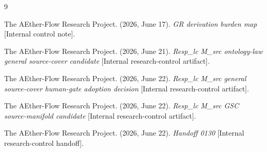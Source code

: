 \documentclass[11pt]{article}
\begin{document}
\begin{thebibliography}{9}

The AEther-Flow Research Project. (2026, June 17). \emph{GR derivation
burden map} [Internal control note].

The AEther-Flow Research Project. (2026, June 21). \emph{Resp\_lc M\_src
ontology-law general source-cover candidate}
[Internal research-control artifact].

The AEther-Flow Research Project. (2026, June 22). \emph{Resp\_lc M\_src
general source-cover human-gate adoption decision}
[Internal research-control artifact].

The AEther-Flow Research Project. (2026, June 22). \emph{Resp\_lc M\_src
GSC source-manifold candidate} [Internal research-control artifact].

The AEther-Flow Research Project. (2026, June 22). \emph{Handoff 0130}
[Internal research-control handoff].

\end{thebibliography}
\end{document}

